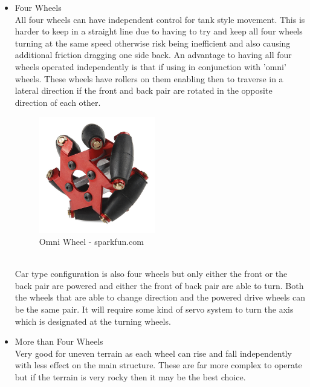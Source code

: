 \begin{itemize}
\begin{itemize}
	\item Four Wheels
	\\All four wheels can have independent control for tank style movement.  This is harder to keep in a straight line due to having to try and keep all four wheels turning at the same speed otherwise risk being inefficient and also causing additional friction dragging one side back.  An advantage to having all four wheels operated independently is that if using in conjunction with 'omni' wheels.  These wheels have rollers on them enabling then to traverse in a lateral direction if the front and back pair are rotated in the opposite direction of each other.
\begin{figure}[h]
\centering
        \includegraphics[width=2.0in] {Images/mechanum.jpg}
        \caption{Omni Wheel - sparkfun.com}
        \label{Omni Wheel}
\end{figure}
	\\Car type configuration is also four wheels but only either the front or the back pair are powered and either the front of back pair are able to turn.  Both the wheels that are able to change direction and the powered drive wheels can be the same pair.  It will require some kind of servo system to turn the axis which is designated at the turning wheels.

	\item More than Four Wheels
	\\Very good for uneven terrain as each wheel can rise and fall independently with less effect on the main structure.  These are far more complex to operate but if the terrain is very rocky then it may be the best choice.
	\end{itemize}


\end{itemize}
